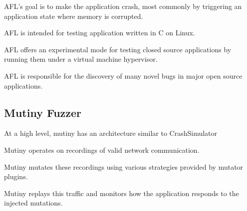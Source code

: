 AFL's goal is to make the application crash, most commonly by triggering an
application state where memory is corrupted.

AFL is intended for testing application written in C on Linux.

AFL offers an experimental mode for testing closed source applications by
running them under a virtual machine hypervisor.

AFL is responsible for the discovery of many novel bugs in major open
source applications.

\subsection{Mutiny Fuzzer}

At a high level, mutiny has an architecture similar to CrashSimulator

Mutiny operates on recordings of valid network communication.

Mutiny mutates these recordings using various strategies provided by
mutator plugins.

Mutiny replays this traffic and monitors how the application responds to
the injected mutations.
